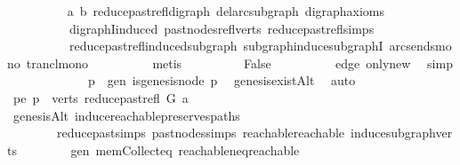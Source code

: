 \begin{isabellebody}
\ \ \ \ \ \ \ \ \isamarkupfalse%
\ a\ b\ reduce{\isacharunderscore}{\kern0pt}past{\isacharunderscore}{\kern0pt}refl{\isacharunderscore}{\kern0pt}digraph\ del{\isacharunderscore}{\kern0pt}arc{\isacharunderscore}{\kern0pt}subgraph\ digraph{\isacharunderscore}{\kern0pt}axioms\isanewline
\ \ \ \ \ \ \ \ \ \ digraphI{\isacharunderscore}{\kern0pt}induced\ past{\isacharunderscore}{\kern0pt}nodes{\isacharunderscore}{\kern0pt}refl{\isacharunderscore}{\kern0pt}verts\ reduce{\isacharunderscore}{\kern0pt}past{\isacharunderscore}{\kern0pt}refl{\isachardot}{\kern0pt}simps\isanewline
\ \ \ \ \ \ \ \ \ \ reduce{\isacharunderscore}{\kern0pt}past{\isacharunderscore}{\kern0pt}refl{\isacharunderscore}{\kern0pt}induced{\isacharunderscore}{\kern0pt}subgraph\ subgraph{\isacharunderscore}{\kern0pt}induce{\isacharunderscore}{\kern0pt}subgraphI\ arcs{\isacharunderscore}{\kern0pt}ends{\isacharunderscore}{\kern0pt}mono\ trancl{\isacharunderscore}{\kern0pt}mono\isanewline
\ \ \ \ \ \ \ \ \isamarkupfalse%
\ metis\isanewline
\ \ \ \ \ \ \isamarkupfalse%
\ \isamarkupfalse%
\ False\isanewline
\ \ \ \ \ \ \ \ \isamarkupfalse%
\ edge\ only{\isacharunderscore}{\kern0pt}new\ \isamarkupfalse%
\ simp\isanewline
\ \ \ \ \isamarkupfalse%
\isanewline
\ \ \isamarkupfalse%
\isanewline
\ \ \ \ \isamarkupfalse%
\ p\ \ gen{\isacharcolon}{\kern0pt}\ {\isachardoublequoteopen}is{\isacharunderscore}{\kern0pt}genesis{\isacharunderscore}{\kern0pt}node\ p{\isachardoublequoteclose}\ \isamarkupfalse%
\ genesis{\isacharunderscore}{\kern0pt}existAlt\ \isamarkupfalse%
\ auto\isanewline
\ \ \ \ \isamarkupfalse%
\ pe{\isacharcolon}{\kern0pt}\ {\isachardoublequoteopen}p\ {\isasymin}\ verts\ {\isacharparenleft}{\kern0pt}reduce{\isacharunderscore}{\kern0pt}past{\isacharunderscore}{\kern0pt}refl\ G\ a{\isacharparenright}{\kern0pt}{\isachardoublequoteclose}\isanewline
\ \ \ \ \ \ \isamarkupfalse%
\ genesisAlt\ induce{\isacharunderscore}{\kern0pt}reachable{\isacharunderscore}{\kern0pt}preserves{\isacharunderscore}{\kern0pt}paths\isanewline
\ \ \ \ \ \ \ \ reduce{\isacharunderscore}{\kern0pt}past{\isachardot}{\kern0pt}simps\ past{\isacharunderscore}{\kern0pt}nodes{\isachardot}{\kern0pt}simps\ reachable{}{\isacharunderscore}{\kern0pt}reachable\ induce{\isacharunderscore}{\kern0pt}subgraph{\isacharunderscore}{\kern0pt}verts\isanewline
\ \ \ \ \ \ \ \ gen\ mem{\isacharunderscore}{\kern0pt}Collect{\isacharunderscore}{\kern0pt}eq\ reachable{\isacharunderscore}{\kern0pt}neq{\isacharunderscore}{\kern0pt}reachable{}\isanewline

\end{isabellebody}
